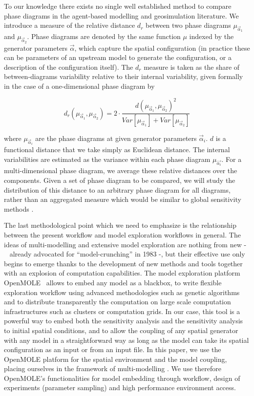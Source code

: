 \documentclass{JASSS}
\begin{document}
To our knowledge there exists no single well established method to compare phase diagrams in the agent-based modelling and geosimulation literature. We introduce a measure of the relative distance $d_r$ between two phase diagrams $\mu_{\vec{\alpha}_1}$ and $\mu_{\vec{\alpha}_2}$. Phase diagrams are denoted by the same function $\mu$ indexed by the generator parameters $\vec{\alpha}$, which capture the spatial configuration (in practice these can be parameters of an upstream model to generate the configuration, or a description of the configuration itself). The $d_r$ measure is taken as the share of between-diagrams variability relative to their internal variability, given formally in the case of a one-dimensional phase diagram by


\begin{equation}\label{eq:phase-distance}
d_r\left(\mu_{\vec{\alpha}_1},\mu_{\vec{\alpha}_2}\right) = 2 \cdot \frac{d(\mu_{\vec{\alpha}_1},\mu_{\vec{\alpha}_2})^2}{Var\left[\mu_{\vec{\alpha}_1}\right] + Var\left[\mu_{\vec{\alpha}_2}\right]}
\end{equation}

where $\mu_{\vec{\alpha}_i}$ are the phase diagrams at given generator parameters $\vec{\alpha}_i$. $d$ is a functional distance that we take simply as Euclidean distance. The internal variabilities are estimated as the variance within each phase diagram $\mu_{\vec{\alpha_i}}$. For a multi-dimensional phase diagram, we average these relative distances over the components. Given a set of phase diagram to be compared, we will study the distribution of this distance to an arbitrary phase diagram for all diagrams, rather than an aggregated measure which would be similar to global sensitivity methods \citep{saltelli2008global}.

The last methodological point which we need to emphasize is the relationship between the present workflow and model exploration workflows in general. The ideas of multi-modelling and extensive model exploration are nothing from new - ~\cite{openshaw1983data} already advocated for ``model-crunching'' in 1983 -, but their effective use only begins to emerge thanks to the development of new methods and tools together with an explosion of computation capabilities. The model exploration platform OpenMOLE~\citep{reuillon2013openmole} allows to embed any model as a blackbox, to write flexible exploration workflow using advanced methodologies such as genetic algorithms and to distribute transparently the computation on large scale computation infrastructures such as clusters or computation grids. In our case, this tool is a powerful way to embed both the sensitivity analysis and the sensitivity analysis to initial spatial conditions, and to allow the coupling of any spatial generator with any model in a straightforward way as long as the model can take its spatial configuration as an input or from an input file. In this paper, we use the OpenMOLE platform for the spatial environment and the model coupling, placing ourselves in the framework of multi-modelling \citep{cottineau2015modular}. We use therefore OpenMOLE's functionalities for model embedding through workflow, design of experiments (parameter sampling) and high performance environment access.
\end{document}
